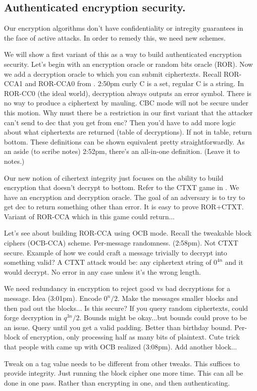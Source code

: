 \subsection{Authenticated encryption security.}

Our encryption algorithms don't have confidentiality or intregity guarantees in the face of active attacks. In order to remedy this, we need new schemes.

We will show a first variant of this as a way to build authenticated encryption security.
Let's begin with an encryption oracle or random bits oracle (ROR).
Now we add a decryption oracle to which you can submit ciphertexts.
Recall ROR-CCA1 and ROR-CCA0 from .
2:50pm curly C is a set, regular C is a string. In ROR-CC0 (the ideal world), decryption always outputs an error symbol. There is no way to produce a ciphertext by mauling. CBC mode will not be secure under this motion. Why must there be a restriction in our first variant that the attacker can't send to dec that you get from enc? Then you'd have to add more logic about what ciphertexts are returned (table of decryptions). If not in table, return bottom. These definitions can be shown equivalent pretty straightforwardly.
As an aside (to scribe notes) 2:52pm, there's an all-in-one definition. (Leave it to notes.) 

Our new notion of cihertext integrity just focuses on the ability to build encryption that doesn't decrypt to bottom. Refer to the CTXT game in . We have an encryption and decryption oracle. The goal of an adversary is to try to get \textsf{dec} to return something other than error. %
It is easy to prove ROR+CTXT. Variant of ROR-CCA which in this game could return...

Let's see about building ROR-CCA using OCB mode.
Recall the tweakable block ciphers (OCB-CCA) scheme. Per-message randomness. (2:58pm). Not CTXT secure.
Example of how we could craft a message trivially to decrypt into something valid? A CTXT attack would be: any ciphertext string of $0^{4n}$ and it would decrypt. No error in any case unless it's the wrong length.

We need redundancy in encryption to reject good vs bad decryptions for a message. Idea (3:01pm). Encode $0^n / 2$. Make the messages smaller blocks and then pad out the blocks... Is this secure? If you query random ciphertexts, could forge decryption in $q^{3n} / 2$. Bounds might be okay...but bounds could prove to be an issue.
Query until you get a valid padding. Better than birthday bound.
Per-block of encryption, only processing half as many bits of plaintext.
Cute trick that people with came up with OCB realized (3:08pm). Add another block... 

Tweak on a tag value needs to be different from other tweaks. This suffices to provide integrity. Just running the block cipher one more time. This can all be done in one pass. Rather than encrypting in one, and then authenticating.